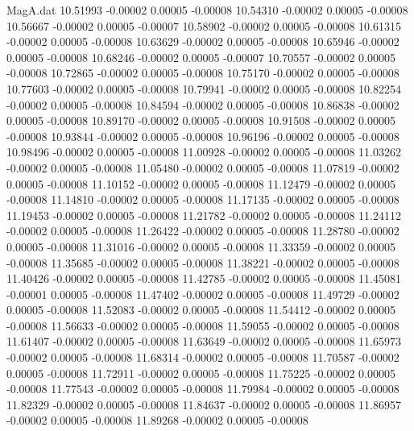 \begin{filecontents}{MagA.dat}
  10.51993   -0.00002    0.00005   -0.00008
  10.54310   -0.00002    0.00005   -0.00008
  10.56667   -0.00002    0.00005   -0.00007
  10.58902   -0.00002    0.00005   -0.00008
  10.61315   -0.00002    0.00005   -0.00008
  10.63629   -0.00002    0.00005   -0.00008
  10.65946   -0.00002    0.00005   -0.00008
  10.68246   -0.00002    0.00005   -0.00007
  10.70557   -0.00002    0.00005   -0.00008
  10.72865   -0.00002    0.00005   -0.00008
  10.75170   -0.00002    0.00005   -0.00008
  10.77603   -0.00002    0.00005   -0.00008
  10.79941   -0.00002    0.00005   -0.00008
  10.82254   -0.00002    0.00005   -0.00008
  10.84594   -0.00002    0.00005   -0.00008
  10.86838   -0.00002    0.00005   -0.00008
  10.89170   -0.00002    0.00005   -0.00008
  10.91508   -0.00002    0.00005   -0.00008
  10.93844   -0.00002    0.00005   -0.00008
  10.96196   -0.00002    0.00005   -0.00008
  10.98496   -0.00002    0.00005   -0.00008
  11.00928   -0.00002    0.00005   -0.00008
  11.03262   -0.00002    0.00005   -0.00008
  11.05480   -0.00002    0.00005   -0.00008
  11.07819   -0.00002    0.00005   -0.00008
  11.10152   -0.00002    0.00005   -0.00008
  11.12479   -0.00002    0.00005   -0.00008
  11.14810   -0.00002    0.00005   -0.00008
  11.17135   -0.00002    0.00005   -0.00008
  11.19453   -0.00002    0.00005   -0.00008
  11.21782   -0.00002    0.00005   -0.00008
  11.24112   -0.00002    0.00005   -0.00008
  11.26422   -0.00002    0.00005   -0.00008
  11.28780   -0.00002    0.00005   -0.00008
  11.31016   -0.00002    0.00005   -0.00008
  11.33359   -0.00002    0.00005   -0.00008
  11.35685   -0.00002    0.00005   -0.00008
  11.38221   -0.00002    0.00005   -0.00008
  11.40426   -0.00002    0.00005   -0.00008
  11.42785   -0.00002    0.00005   -0.00008
  11.45081   -0.00001    0.00005   -0.00008
  11.47402   -0.00002    0.00005   -0.00008
  11.49729   -0.00002    0.00005   -0.00008
  11.52083   -0.00002    0.00005   -0.00008
  11.54412   -0.00002    0.00005   -0.00008
  11.56633   -0.00002    0.00005   -0.00008
  11.59055   -0.00002    0.00005   -0.00008
  11.61407   -0.00002    0.00005   -0.00008
  11.63649   -0.00002    0.00005   -0.00008
  11.65973   -0.00002    0.00005   -0.00008
  11.68314   -0.00002    0.00005   -0.00008
  11.70587   -0.00002    0.00005   -0.00008
  11.72911   -0.00002    0.00005   -0.00008
  11.75225   -0.00002    0.00005   -0.00008
  11.77543   -0.00002    0.00005   -0.00008
  11.79984   -0.00002    0.00005   -0.00008
  11.82329   -0.00002    0.00005   -0.00008
  11.84637   -0.00002    0.00005   -0.00008
  11.86957   -0.00002    0.00005   -0.00008
  11.89268   -0.00002    0.00005   -0.00008

\end{filecontents}

